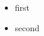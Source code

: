 \newcommand{\bi}{\begin{itemize}}
\newcommand{\ei}{\end{itemize}}
\bi
  \item first
  \item second
\ei
